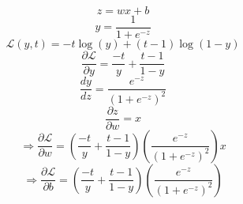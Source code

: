 \documentclass[12pt]{article}
\begin{document}
\setlength\parskip{0.5em minus 0.2em}
\[z = wx + b\]
\[y = \dfrac{1}{1 + e^{-z}}\]
\[\mathcal{L}(y,t) = -t\log(y) + (t-1)\log(1-y)\]
\[\dfrac{\partial \mathcal{L}}{\partial y}
= \dfrac{-t}{y} + \dfrac{t-1}{1-y}\]
\[\dfrac{dy}{dz} = \dfrac{e^{-z}}{(1 + e^{-z})^2}\]
\[\dfrac{\partial z}{\partial w}
= x\]
\[\Rightarrow 
\dfrac{\partial \mathcal{L}}{\partial w}
= \left(\dfrac{-t}{y}
+ \dfrac{t-1}{1-y}\right)
\left(\dfrac{e^{-z}}{(1+e^{-z})^2}\right)x\]
\[\Rightarrow 
\dfrac{\partial \mathcal{L}}{\partial b}
= \left(\dfrac{-t}{y}
+ \dfrac{t-1}{1-y}\right)
\left(\dfrac{e^{-z}}{(1+e^{-z})^2}\right)
\]
\end{document}
